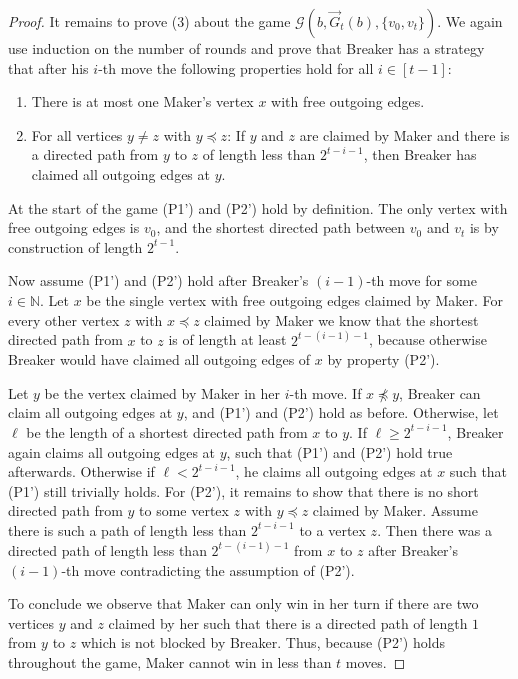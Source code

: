 \documentclass[reqno, 12pt]{amsart}
\numberwithin{equation}{section}
\numberwithin{figure}{section}
\begin{document}
\begin{proof}
\smallskip

It remains to prove (3) about the game
$\mathcal{G}(b,\vec{G}_t(b),\{v_0,v_t\})$. We again use induction on the number of rounds and prove that Breaker has a strategy that after his $i$-th move the following properties hold for all $i \in [t - 1]$:
\begin{enumerate}
\item[(P1')] There is at most one Maker's vertex $x$ with free outgoing edges. 
\item[(P2')] For all vertices $y\neq z$ with $y \preccurlyeq z$: If $y$ and $z$ are claimed by Maker and there is a directed path from $y$ to $z$ of length less than $2^{t - i - 1}$, then Breaker has claimed all outgoing edges at $y$.
\end{enumerate}

At the start of the game (P1') and (P2') hold by definition. The only vertex with free outgoing edges is $v_0$, and the shortest directed path between $v_0$ and $v_t$ is by construction of length $2^{t-1}$.

Now assume (P1') and (P2') hold after Breaker's $(i-1)$-th move for some $i \in \mathbb{N}$. Let $x$ be the single vertex with free outgoing edges claimed by Maker. For every other vertex $z$ with $x \preccurlyeq z$ claimed by Maker we know that the shortest directed path from $x$ to $z$ is of length at least $2 ^ {t - (i-1) - 1}$, because otherwise Breaker would have claimed all outgoing edges of $x$ by property (P2').

Let $y$ be the vertex claimed by Maker in her $i$-th move. If $x \not\preccurlyeq y$, Breaker can claim all outgoing edges at $y$, and (P1') and (P2') hold as before. Otherwise, let $\ell$ be the length of a shortest directed path from $x$ to $y$. If $\ell \geq 2 ^ {t - i - 1}$, Breaker again claims all outgoing edges at $y$, such that (P1') and (P2') hold true afterwards. Otherwise if $\ell < 2 ^{t - i - 1}$, he claims all outgoing edges at $x$ such that (P1') still trivially holds. For (P2'), it remains to show that there is no short directed path from $y$ to some vertex $z$ with $y \preccurlyeq z$ claimed by Maker. Assume there is such a path of length less than $2 ^ {t - i - 1}$ to a vertex $z$. Then there was a directed path of length less than $2 ^{t - (i - 1) - 1}$ from $x$ to $z$ after Breaker's $(i-1)$-th move contradicting the assumption of (P2'). 

To conclude we observe that Maker can only win in her turn if there are two vertices $y$ and $z$ claimed by her such that there is a directed path of length $1$ from $y$ to $z$ which is not blocked by Breaker. Thus, because (P2') holds throughout the game, Maker cannot win in less than $t$ moves.
\end{proof}
\end{document}
